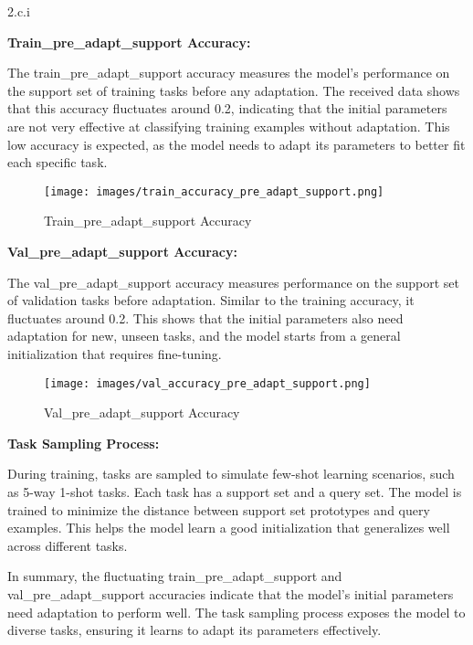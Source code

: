 \clearpage

\LARGE
2.c.i
\normalsize

\begin{answer}
    \textbf{Train\_pre\_adapt\_support Accuracy:}

The train\_pre\_adapt\_support accuracy measures the model's performance on the support set of training tasks before any adaptation. The received data shows that this accuracy fluctuates around 0.2, indicating that the initial parameters are not very effective at classifying training examples without adaptation. This low accuracy is expected, as the model needs to adapt its parameters to better fit each specific task.

\begin{figure}[h!]
\centering
\texttt{[image: images/train\_accuracy\_pre\_adapt\_support.png]}
\caption{Train\_pre\_adapt\_support Accuracy}
\end{figure}

\textbf{Val\_pre\_adapt\_support Accuracy:}

The val\_pre\_adapt\_support accuracy measures performance on the support set of validation tasks before adaptation. Similar to the training accuracy, it fluctuates around 0.2. This shows that the initial parameters also need adaptation for new, unseen tasks, and the model starts from a general initialization that requires fine-tuning.

\begin{figure}[h!]
\centering
\texttt{[image: images/val\_accuracy\_pre\_adapt\_support.png]}
\caption{Val\_pre\_adapt\_support Accuracy}
\end{figure}

\textbf{Task Sampling Process:}

During training, tasks are sampled to simulate few-shot learning scenarios, such as 5-way 1-shot tasks. Each task has a support set and a query set. The model is trained to minimize the distance between support set prototypes and query examples. This helps the model learn a good initialization that generalizes well across different tasks.

In summary, the fluctuating train\_pre\_adapt\_support and val\_pre\_adapt\_support accuracies indicate that the model's initial parameters need adaptation to perform well. The task sampling process exposes the model to diverse tasks, ensuring it learns to adapt its parameters effectively.
\end{answer}

